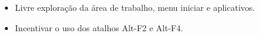 \begin{itemize}
	\item Livre exploração da área de trabalho, menu iniciar e aplicativos.
	\item Incentivar o uso dos atalhos Alt-F2 e Alt-F4.
\end{itemize}

